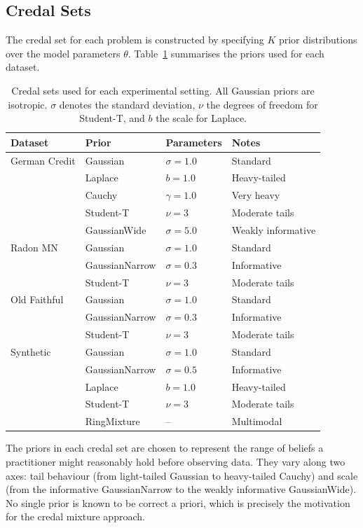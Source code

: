 \subsection{Credal Sets}

The credal set for each problem is 
constructed by specifying $K$ prior 
distributions over the model parameters 
$\theta$. Table~\ref{tab:priors} 
summarises the priors used for each 
dataset.

\begin{table}[h]
\centering
\caption{Credal sets used for each 
experimental setting. All Gaussian 
priors are isotropic. $\sigma$ denotes 
the standard deviation, $\nu$ the 
degrees of freedom for Student-T, and 
$b$ the scale for Laplace.}
\label{tab:priors}
{\singlespacing
\begin{tabular}{llll}
\hline
Dataset & Prior & Parameters & Notes \\
\hline
German Credit & Gaussian & $\sigma = 1.0$ & Standard \\
 & Laplace & $b = 1.0$ & Heavy-tailed \\
 & Cauchy & $\gamma = 1.0$ & Very heavy \\
 & Student-T & $\nu = 3$ & Moderate tails \\
 & GaussianWide & $\sigma = 5.0$ & Weakly informative \\
\hline
Radon MN & Gaussian & $\sigma = 1.0$ & Standard \\
 & GaussianNarrow & $\sigma = 0.3$ & Informative \\
 & Student-T & $\nu = 3$ & Moderate tails \\
\hline
Old Faithful & Gaussian & $\sigma = 1.0$ & Standard \\
 & GaussianNarrow & $\sigma = 0.3$ & Informative \\
 & Student-T & $\nu = 3$ & Moderate tails \\
\hline
Synthetic & Gaussian & $\sigma = 1.0$ & Standard \\
 & GaussianNarrow & $\sigma = 0.5$ & Informative \\
 & Laplace & $b = 1.0$ & Heavy-tailed \\
 & Student-T & $\nu = 3$ & Moderate tails \\
 & RingMixture & -- & Multimodal \\
\hline
\end{tabular}}
\end{table}

The priors in each credal set are chosen 
to represent the range of beliefs a 
practitioner might reasonably hold before 
observing data. They vary along two axes: 
tail behaviour (from light-tailed Gaussian 
to heavy-tailed Cauchy) and scale (from 
the informative GaussianNarrow to the 
weakly informative GaussianWide). No 
single prior is known to be correct 
a priori, which is precisely the 
motivation for the credal mixture 
approach.


